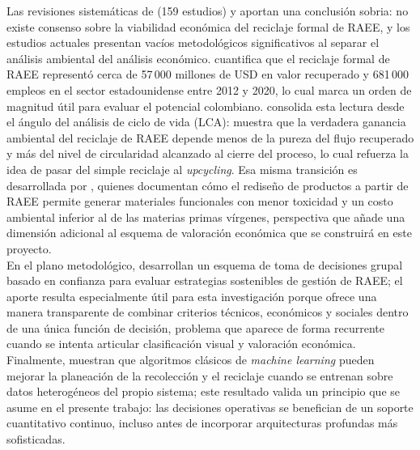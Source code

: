 Las revisiones sistemáticas de \cite{leeEnvironmentalEconomicImpacts2024b} (159 estudios) y \cite{elgarahyRevitalizingCircularEconomy2024} aportan una conclusión sobria: no existe consenso sobre la viabilidad económica del reciclaje formal de RAEE, y los estudios actuales presentan vacíos metodológicos significativos al separar el análisis ambiental del análisis económico. \cite{dixitBiologicalApproachesEwaste2023} cuantifica que el reciclaje formal de RAEE representó cerca de 57\,000 millones de USD en valor recuperado y 681\,000 empleos en el sector estadounidense entre 2012 y 2020, lo cual marca un orden de magnitud útil para evaluar el potencial colombiano. \cite{heDrivingSustainableCircular2024} consolida esta lectura desde el ángulo del análisis de ciclo de vida (LCA): muestra que la verdadera ganancia ambiental del reciclaje de RAEE depende menos de la pureza del flujo recuperado y más del nivel de circularidad alcanzado al cierre del proceso, lo cual refuerza la idea de pasar del simple reciclaje al \textit{upcycling}. Esa misma transición es desarrollada por \cite{dagwar_upcycling_2026}, quienes documentan cómo el rediseño de productos a partir de RAEE permite generar materiales funcionales con menor toxicidad y un costo ambiental inferior al de las materias primas vírgenes, perspectiva que añade una dimensión adicional al esquema de valoración económica que se construirá en este proyecto.\\

En el plano metodológico, \cite{seikhIdentifyingSustainableStrategies2024} desarrollan un esquema de toma de decisiones grupal basado en confianza para evaluar estrategias sostenibles de gestión de RAEE; el aporte resulta especialmente útil para esta investigación porque ofrece una manera transparente de combinar criterios técnicos, económicos y sociales dentro de una única función de decisión, problema que aparece de forma recurrente cuando se intenta articular clasificación visual y valoración económica. Finalmente, \cite{varshaDataDrivenEWasteManagement2025a} muestran que algoritmos clásicos de \textit{machine learning} pueden mejorar la planeación de la recolección y el reciclaje cuando se entrenan sobre datos heterogéneos del propio sistema; este resultado valida un principio que se asume en el presente trabajo: las decisiones operativas se benefician de un soporte cuantitativo continuo, incluso antes de incorporar arquitecturas profundas más sofisticadas.

